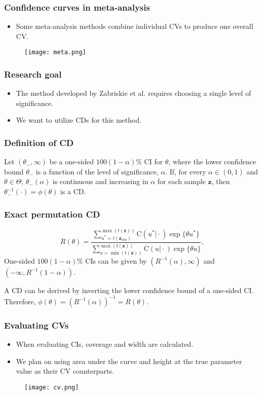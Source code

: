 \documentclass{beamer}
\begin{document}
\begin{frame}
  \frametitle{Confidence curves in meta-analysis}
  \begin{itemize}
    \item Some meta-analysis methods combine individual CVs to produce one overall CV.
  \end{itemize}
  \begin{figure}
    \texttt{[image: meta.png]}
  \end{figure}
\end{frame}

\begin{frame}
  \frametitle{Research goal}
  \begin{itemize}
    \item The method developed by Zabriskie et al. requires choosing a single level of significance.
    \item We want to utilize CDs for this method.
  \end{itemize}
\end{frame}

\begin{frame} 
  \frametitle{Definition of CD}
   Let $(\theta_-, \infty)$ be a one-sided $100(1-\alpha)\%$ CI for $\theta$, where the lower confidence bound $\theta_-$ is a function of the level of significance, $\alpha$. If, for every $\alpha \in (0, 1)$ and $\theta \in \Theta$, $\theta_-(\alpha)$ is continuous and increasing in $\alpha$ for each sample $\textbf{z}$, then $\theta_{-}^{-1}(\cdot) = \phi(\theta)$ is a CD.
\end{frame}


\begin{frame}
  \frametitle{Exact permutation CD}
  \begin{equation*} \label{eq:permCI}
    R(\theta) = \frac
    {\sum_{u^* = t(\mathbf{z}_{\text{obs}})}^{\max(t(\mathbf{z}))} \text{C}(u^* \vert \cdot) \exp\{\theta u^*\}}
    {\sum_{u = \min(t(\mathbf{z}))}^{\max(t(\mathbf{z}))} \text{C}(u \vert \cdot) \exp\{\theta u\}} \text{,}
  \end{equation*}
  One-sided $100(1-\alpha)$\% CIs can be given by $(R^{-1}(\alpha),\infty)$ and $(-\infty, R^{-1}(1-\alpha))$.

  A CD can be derived by inverting the lower confidence bound of a one-sided CI. Therefore, $\phi(\theta) = (R^{-1}(\alpha))^{-1} = R(\theta)$. 
\end{frame}

\begin{frame} 
  \frametitle{Evaluating CVs}
  \begin{itemize}
    \item When evaluating CIs, coverage and width are calculated.
    \item We plan on using area under the curve and height at the true parameter value as their CV counterparts. 
  \end{itemize}
  \begin{figure}
    \texttt{[image: cv.png]}
  \end{figure}
\end{frame}
\end{document}
